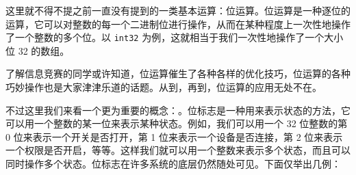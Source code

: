 这里就不得不提之前一直没有提到的一类基本运算：位运算。位运算是一种逐位的运算，它可以对整数的每一个二进制位进行操作，从而在某种程度上一次性地操作了一个整数的多个位。以 \texttt{int32} 为例，这就相当于我们一次性地操作了一个大小位 32 的数组。

了解信息竞赛的同学或许知道，位运算催生了各种各样的优化技巧，位运算的各种巧妙操作也是大家津津乐道的话题。从到，再到，位运算的应用无处不在。

不过这里我们来看一个更为重要的概念：。位标志是一种用来表示状态的方法，它可以用一个整数的某一位来表示某种状态。例如，我们可以用一个 32 位整数的第 0 位来表示一个开关是否打开，第 1 位来表示一个设备是否连接，第 2 位来表示一个权限是否开启，等等。这样我们就可以用一个整数来表示多个状态，而且可以同时操作多个状态。位标志在许多系统的底层仍然随处可见。下面仅举出几例：

